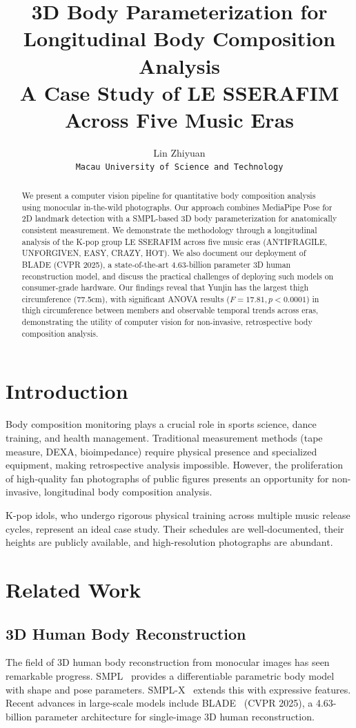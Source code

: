 \documentclass[11pt,a4paper]{article}
\title{3D Body Parameterization for Longitudinal Body Composition Analysis \\
\large A Case Study of LE SSERAFIM Across Five Music Eras}
\author{
  Lin Zhiyuan\\
  \texttt{Macau University of Science and Technology}
}
\begin{document}
\maketitle

\begin{abstract}
We present a computer vision pipeline for quantitative body composition analysis using monocular in-the-wild photographs. Our approach combines MediaPipe Pose for 2D landmark detection with a SMPL-based 3D body parameterization for anatomically consistent measurement. We demonstrate the methodology through a longitudinal analysis of the K-pop group LE SSERAFIM across five music eras (ANTIFRAGILE, UNFORGIVEN, EASY, CRAZY, HOT). We also document our deployment of BLADE (CVPR 2025), a state-of-the-art 4.63-billion parameter 3D human reconstruction model, and discuss the practical challenges of deploying such models on consumer-grade hardware. Our findings reveal that Yunjin has the largest thigh circumference (77.5cm), with significant ANOVA results ($F=17.81, p<0.0001$) in thigh circumference between members and observable temporal trends across eras, demonstrating the utility of computer vision for non-invasive, retrospective body composition analysis.
\end{abstract}

\section{Introduction}
Body composition monitoring plays a crucial role in sports science, dance training, and health management. Traditional measurement methods (tape measure, DEXA, bioimpedance) require physical presence and specialized equipment, making retrospective analysis impossible. However, the proliferation of high-quality fan photographs of public figures presents an opportunity for non-invasive, longitudinal body composition analysis.

K-pop idols, who undergo rigorous physical training across multiple music release cycles, represent an ideal case study. Their schedules are well-documented, their heights are publicly available, and high-resolution photographs are abundant.

\section{Related Work}

\subsection{3D Human Body Reconstruction}
The field of 3D human body reconstruction from monocular images has seen remarkable progress. SMPL~\cite{smpl} provides a differentiable parametric body model with shape and pose parameters. SMPL-X~\cite{smplx} extends this with expressive features. Recent advances in large-scale models include BLADE~\cite{blade} (CVPR 2025), a 4.63-billion parameter architecture for single-image 3D human reconstruction. 
\end{document}

